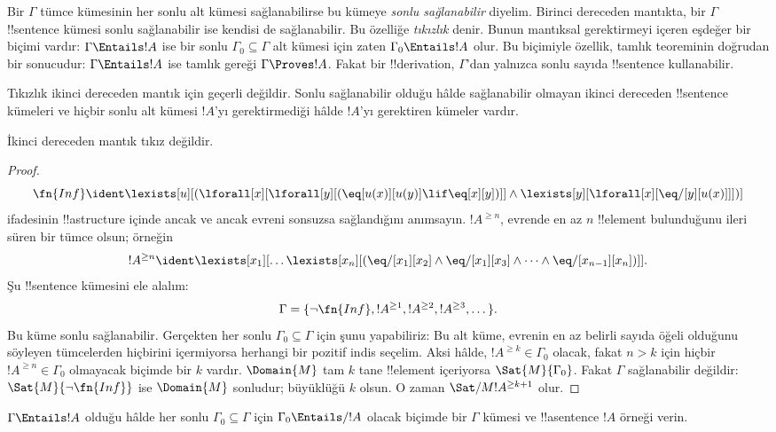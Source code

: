 \documentclass[../../../include/open-logic-section]{subfiles}
\begin{document}


\begin{explain}
Bir $\Gamma$ tümce kümesinin her sonlu alt kümesi sağlanabilirse bu kümeye
\emph{sonlu sağlanabilir} diyelim. Birinci dereceden mantıkta, bir
$\Gamma$ !!{sentence} kümesi sonlu sağlanabilir ise kendisi de
sağlanabilir. Bu özelliğe \emph{tıkızlık} denir. Bunun mantıksal
gerektirmeyi içeren eşdeğer bir biçimi vardır: $\Gamma\Entails !A$ ise bir
sonlu $\Gamma_0\subseteq\Gamma$ alt kümesi için zaten
$\Gamma_0\Entails !A$ olur. Bu biçimiyle özellik, tamlık teoreminin doğrudan
bir sonucudur: $\Gamma\Entails !A$ ise tamlık gereği $\Gamma\Proves !A$.
Fakat bir !!{derivation}, $\Gamma$'dan yalnızca sonlu sayıda !!{sentence}
kullanabilir.

Tıkızlık ikinci dereceden mantık için geçerli değildir. Sonlu sağlanabilir
olduğu hâlde sağlanabilir olmayan ikinci dereceden !!{sentence} kümeleri ve
hiçbir sonlu alt kümesi $!A$'yı gerektirmediği hâlde $!A$'yı gerektiren
kümeler vardır.
\end{explain}


\begin{thm}
İkinci dereceden mantık tıkız değildir.
\end{thm}

\begin{proof}
\[
\fn{Inf} \ident \lexists[u][(\lforall[x][\lforall[y][(\eq[u(x)][u(y)]
      \lif \eq[x][y])]] \land \lexists[y][\lforall[x][\eq/[y][u(x)]]])]
\]
ifadesinin !!a{structure} içinde ancak ve ancak evreni sonsuzsa
sağlandığını anımsayın. $!A^{\ge n}$, evrende en az $n$
!!{element} bulunduğunu ileri süren bir tümce olsun; örneğin
\[
!A^{\ge n} \ident \lexists[x_1][\dots\lexists[x_n][(\eq/[x_1][x_2]
    \land \eq/[x_1][x_3] \land \dots \land \eq/[x_{n-1}][x_n])]].
\]
Şu !!{sentence} kümesini ele alalım:
\[
\Gamma = \{\lnot \fn{Inf}, !A^{\ge 1}, !A^{\ge 2}, !A^{\ge 3}, \dots\}.
\]
Bu küme sonlu sağlanabilir. Gerçekten her sonlu
$\Gamma_0\subseteq\Gamma$ için şunu yapabiliriz: Bu alt küme, evrenin en az
belirli sayıda öğeli olduğunu söyleyen tümcelerden hiçbirini içermiyorsa
herhangi bir pozitif indis seçelim. Aksi hâlde, $!A^{\ge k}\in\Gamma_0$
olacak, fakat $n>k$ için hiçbir $!A^{\ge n}\in\Gamma_0$ olmayacak biçimde
bir $k$ vardır. $\Domain{M}$ tam $k$ tane !!{element} içeriyorsa
$\Sat{M}{\Gamma_0}$. Fakat
$\Gamma$ sağlanabilir değildir: $\Sat{M}{\lnot\fn{Inf}}$ ise
$\Domain{M}$ sonludur; büyüklüğü $k$ olsun. O zaman
$\Sat/{M}{!A^{\ge k+1}}$ olur.
\end{proof}

\begin{prob}
$\Gamma\Entails !A$ olduğu hâlde her sonlu
$\Gamma_0\subseteq\Gamma$ için $\Gamma_0\Entails/ !A$ olacak biçimde bir
$\Gamma$ kümesi ve !!a{sentence} $!A$ örneği verin.
\end{prob}
\end{document}
